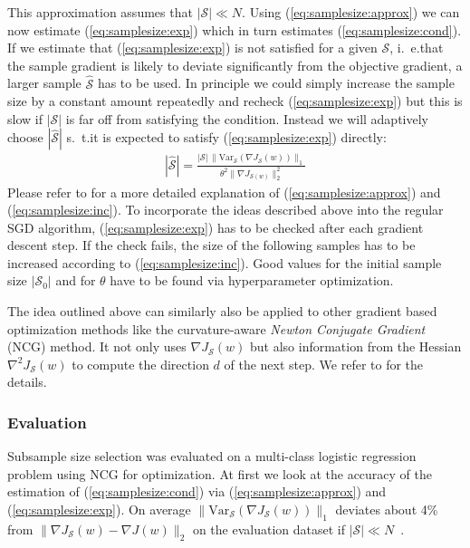 This approximation assumes that \(|\mathcal{S}| \ll N\).
Using (\ref{eq:samplesize:approx}) we can now estimate (\ref{eq:samplesize:exp}) which in turn estimates (\ref{eq:samplesize:cond}).
If we estimate that (\ref{eq:samplesize:exp}) is not satisfied for a given \(\mathcal{S}\), i.~e.\@ that the sample gradient is likely to deviate significantly from the objective gradient, a larger sample \(\widehat{\mathcal{S}}\) has to be used.
In principle we could simply increase the sample size by a constant amount repeatedly and recheck (\ref{eq:samplesize:exp}) but this is slow if \(|\mathcal{S}|\) is far off from satisfying the condition.
Instead we will adaptively choose \(|\widehat{\mathcal{S}}|\) s.~t.\@ it is expected to satisfy (\ref{eq:samplesize:exp}) directly:
\begin{align}
	|\widehat{\mathcal{S}}| = \frac{|\mathcal{S}|\, \|\mathrm{Var}_{\mathcal{S}}(\nabla J_{\mathcal{S}}(w))\|_1}{\theta^2 \|\nabla J_{\mathcal{S}(w)}\|_2^2}\label{eq:samplesize:inc}
\end{align}
Please refer to \citet[chapter~3]{Byrd2012} for a more detailed explanation of (\ref{eq:samplesize:approx}) and (\ref{eq:samplesize:inc}).
To incorporate the ideas described above into the regular SGD algorithm, (\ref{eq:samplesize:exp}) has to be checked after each gradient descent step.
If the check fails, the size of the following samples has to be increased according to (\ref{eq:samplesize:inc}).
Good values for the initial sample size \(|\mathcal{S}_0|\) and for \(\theta\) have to be found via hyperparameter optimization.

The idea outlined above can similarly also be applied to other gradient based optimization methods like the curvature-aware \textit{Newton Conjugate Gradient} (NCG) method.
It not only uses \(\nabla J_{\mathcal{S}}(w)\) but also information from the Hessian \(\nabla^2 J_{\mathcal{S}}(w)\) to compute the direction \(d\) of the next step.
We refer to \citet[chapter~5]{Byrd2012} for the details.

\subsubsection{Evaluation}%
\label{sec:params:samplesize:eval}

Subsample size selection was evaluated on a multi-class logistic regression problem using NCG for optimization.
At first we look at the accuracy of the estimation of (\ref{eq:samplesize:cond}) via (\ref{eq:samplesize:approx}) and (\ref{eq:samplesize:exp}).
On average \(\|\mathrm{Var}_{\mathcal{S}}(\nabla J_{\mathcal{S}}(w))\|_1\) deviates about 4\% from \(\|\nabla J_{\mathcal{S}}(w) - \nabla J(w) \|_2\) on the evaluation dataset if \(|\mathcal{S}| \ll N\)~\cite[tbl.~5.1]{Byrd2012}.


